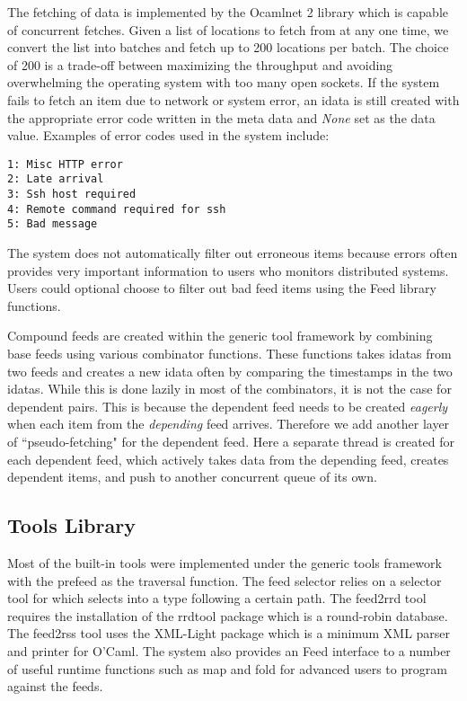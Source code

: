 The fetching of data is implemented by
the Ocamlnet 2 library which is capable of concurrent fetches. 
Given a list of locations to fetch from at any one time, 
we convert the list into batches and fetch up to 200 locations
per batch. The choice of 200 is a trade-off between maximizing
the throughput and avoiding overwhelming the operating system
with too many open sockets. If the system fails to fetch an
item due to network or system error, an idata is still created
with the appropriate error code written in the meta data and
{\em None} set as the data value. Examples of error codes used
in the system include:
{\small \begin{verbatim}
1: Misc HTTP error
2: Late arrival
3: Ssh host required
4: Remote command required for ssh
5: Bad message
\end{verbatim}}
The \padsd{} system does not 
automatically filter out erroneous items because errors often 
provides very important information to users who monitors 
distributed systems. Users could optional choose to filter
out bad feed items using the Feed library functions.

Compound feeds are created within the generic tool framework by
combining base feeds using various combinator functions.
These functions takes idatas from two feeds and creates a new idata often
by comparing the timestamps in the two idatas. While this is done
lazily in most of the combinators, it is not the case for
dependent pairs. This is because the dependent feed needs to be
created {\em eagerly} when each item from the {\em depending}
feed arrives. Therefore we add another layer of ``pseudo-fetching"
for the dependent feed. Here a separate thread is created for each
dependent feed, which actively takes data from the depending
feed, creates dependent items, and push to another concurrent
queue of its own.  
 
\subsection{Tools Library}
Most of the built-in tools were implemented under the
generic tools framework with the prefeed as the traversal
function. The feed selector relies on a selector tool
for \padsml{} which selects into a \padsml{} type following
a certain path. The feed2rrd tool requires the installation
of the rrdtool package which is a round-robin database. 
The feed2rss tool uses the XML-Light package which
is a minimum XML parser and printer for O'Caml.
The system also provides an Feed interface to a number of
useful runtime functions such as map and fold for advanced
users to program against the feeds.

